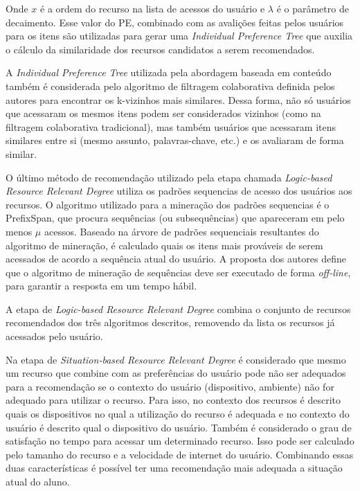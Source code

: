 Onde $x$ é a ordem do recurso na lista de acessos do usuário e $\lambda$ é o parâmetro de decaimento. Esse valor do PE,
combinado com as avalições feitas pelos usuários para os itens são utilizadas para gerar uma \textit{Individual Preference Tree}
que auxilia o cálculo da similaridade dos recursos candidatos a serem recomendados.

A \textit{Individual Preference Tree} utilizada pela abordagem baseada em conteúdo também é considerada pelo algoritmo de
filtragem colaborativa definida pelos autores para encontrar os k-vizinhos mais similares. Dessa forma, não só usuários
que acessaram os mesmos itens podem ser considerados vizinhos (como na filtragem colaborativa tradicional), mas também
usuários que acessaram itens similares entre si (mesmo assunto, palavras-chave, etc.) e os avaliaram de forma similar.

O último método de recomendação utilizado pela etapa chamada \textit{Logic-based Resource Relevant Degree} utiliza os padrões
sequencias de acesso dos usuários aos recursos. O algoritmo utilizado para a mineração dos padrões sequencias é o
PrefixSpan, que procura sequências (ou subsequências) que apareceram em pelo menos $\mu$ acessos. Baseado na árvore de
padrões sequenciais resultantes do algoritmo de mineração, é calculado quais os itens mais prováveis de serem acessados
de acordo a sequência atual do usuário. A proposta dos autores define que o algoritmo de mineração de sequências deve
ser executado de forma \textit{off-line}, para garantir a resposta em um tempo hábil.

A etapa de \textit{Logic-based Resource Relevant Degree} combina o conjunto de recursos recomendados dos três algoritmos
descritos, removendo da lista os recursos já acessados pelo usuário.

Na etapa de \textit{Situation-based Resource Relevant Degree} é considerado que mesmo um recurso que combine com as preferências
do usuário pode não ser adequados para a recomendação se o contexto do usuário (dispositivo, ambiente) não for adequado
para utilizar o recurso. Para isso, no contexto dos recursos é descrito quais os dispositivos no qual a utilização do
recurso é adequada e no contexto do usuário é descrito qual o dispositivo do usuário. Também é considerado o grau de
satisfação no tempo para acessar um determinado recurso. Isso pode ser calculado pelo tamanho do recurso e a velocidade
de internet do usuário. Combinando essas duas características é possível ter uma recomendação mais adequada a situação
atual do aluno.

